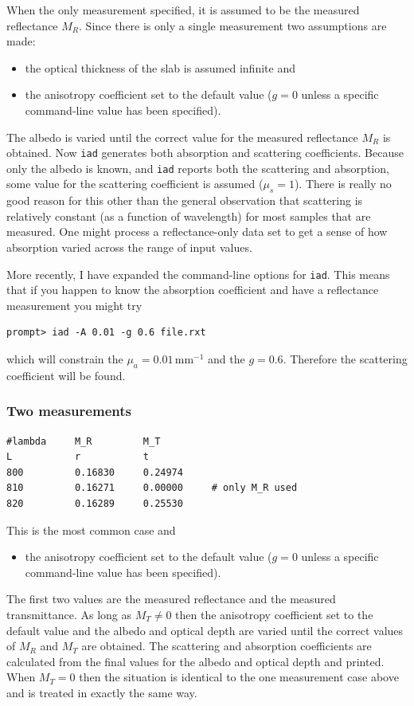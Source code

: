 \documentclass{article}
\newcommand\iadprog{\texttt{iad}}
\begin{document}
When the only measurement specified, it is assumed to be the measured reflectance $M_R$.
Since there is only a single measurement two assumptions are made:
\begin{itemize}
\item
the optical thickness of the slab is assumed infinite and 
\item 
the anisotropy
coefficient set to the default value ($g=0$ unless a specific command-line 
value has been specified).  
\end{itemize}
The albedo is varied until the correct value
for the measured reflectance $M_R$ is obtained.  Now \iadprog{} generates both absorption
and scattering coefficients.  Because only the albedo is known,
and \iadprog{} reports both the scattering and absorption, some value for the
scattering coefficient is assumed ($\mu_s=1$).  There is really no good reason for this
other than the general observation that scattering is relatively constant
(as a function of wavelength) for most samples that are measured.  One might 
process a reflectance-only data set to get a 
sense of how absorption varied across the range of input values.

More recently, I have expanded the command-line options for \iadprog{}.  This
means that if you happen to know the absorption coefficient and have a reflectance
measurement you might try
\begin{verbatim}
prompt> iad -A 0.01 -g 0.6 file.rxt
\end{verbatim}
which will constrain the $\mu_a=0.01$\,mm$^{-1}$ and the $g=0.6$.  Therefore
the scattering coefficient will be found.

\subsubsection{Two measurements}

\begin{center}
\begin{minipage}{9cm}
\scriptsize
\begin{verbatim}
#lambda     M_R         M_T
L           r           t
800         0.16830     0.24974
810         0.16271     0.00000     # only M_R used
820         0.16289     0.25530
\end{verbatim}
\end{minipage}
\end{center}
This is the most common case and
\begin{itemize}
\item 
the anisotropy
coefficient set to the default value ($g=0$ unless a specific command-line 
value has been specified).  
\end{itemize}
The first two values are the measured
reflectance and the measured transmittance. As long as
$M_T \ne 0$ then the anisotropy coefficient set to the default value and
the albedo and optical depth are varied until the correct values of $M_R$ and 
$M_T$ are obtained.  The scattering and absorption coefficients are calculated
from the final values for the albedo and optical depth and printed. When $M_T=0$
then the situation is identical to the one measurement case above and is treated
in exactly the same way.
\end{document}
